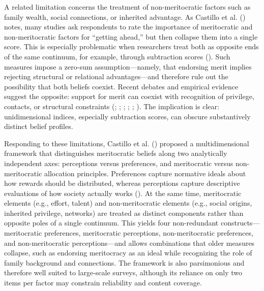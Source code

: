 \documentclass[
  13pt,
]{article}
\begin{document}
A related limitation concerns the treatment of non-meritocratic factors
such as family wealth, social connections, or inherited advantage. As
Castillo et al. ()
notes, many studies ask respondents to rate the importance of
meritocratic and non-meritocratic factors for ``getting ahead,'' but
then collapse them into a single score. This is especially problematic
when researchers treat both as opposite ends of the same continuum, for
example, through subtraction scores
().
Such measures impose a zero-sum assumption---namely, that endorsing
merit implies rejecting structural or relational advantages---and
therefore rule out the possibility that both beliefs coexist. Recent
debates and empirical evidence suggest the opposite: support for merit
can coexist with recognition of privilege, contacts, or structural
constraints (; ;
;
;
;
). The implication is
clear: unidimensional indices, especially subtraction scores, can
obscure substantively distinct belief profiles.

Responding to these limitations, Castillo et al.
() proposed a
multidimensional framework that distinguishes meritocratic beliefs along
two analytically independent axes: perceptions versus preferences, and
meritocratic versus non-meritocratic allocation principles. Preferences
capture normative ideals about how rewards should be distributed,
whereas perceptions capture descriptive evaluations of how society
actually works ().
At the same time, meritocratic elements (e.g., effort, talent) and
non-meritocratic elements (e.g., social origins, inherited privilege,
networks) are treated as distinct components rather than opposite poles
of a single continuum. This yields four non-redundant
constructs---meritocratic preferences, meritocratic perceptions,
non-meritocratic preferences, and non-meritocratic perceptions---and
allows combinations that older measures collapse, such as endorsing
meritocracy as an ideal while recognizing the role of family background
and connections. The framework is also parsimonious and therefore well
suited to large-scale surveys, although its reliance on only two items
per factor may constrain reliability and content coverage.
\end{document}
